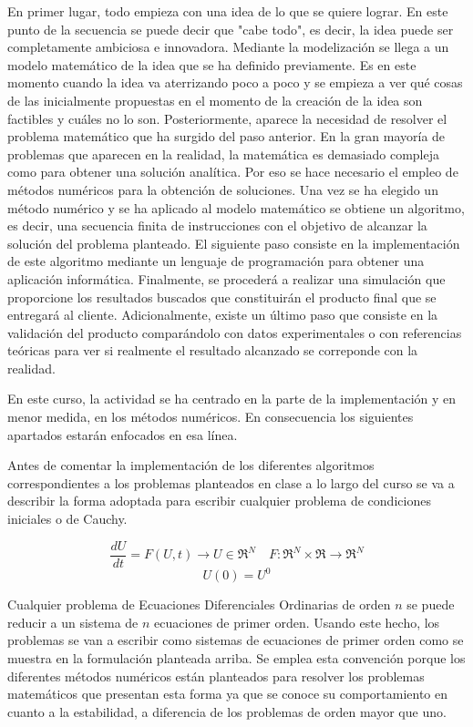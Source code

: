 \documentclass{article}
\begin{document}
	En primer lugar, todo empieza con una idea de lo que se quiere lograr. En este punto de la secuencia se puede decir que "cabe todo", es decir, la idea puede ser completamente ambiciosa e innovadora. Mediante la modelización se llega a un modelo matemático de la idea que se ha definido previamente. Es en este momento cuando la idea va aterrizando poco a poco y se empieza a ver qué cosas de las inicialmente propuestas en el momento de la creación de la idea son factibles y cuáles no lo son. Posteriormente, aparece la necesidad de resolver el problema matemático que ha surgido del paso anterior. En la gran mayoría de problemas que aparecen en la realidad, la matemática es demasiado compleja como para obtener una solución analítica. Por eso se hace necesario el empleo de métodos numéricos para la obtención de soluciones. Una vez se ha elegido un método numérico y se ha aplicado al modelo matemático se obtiene un algoritmo, es decir, una secuencia finita de instrucciones con el objetivo de alcanzar la solución del problema planteado. El siguiente paso consiste en la implementación de este algoritmo mediante un lenguaje de programación para obtener una aplicación informática. Finalmente, se procederá a realizar una simulación que proporcione los resultados buscados que constituirán el producto final que se entregará al cliente. Adicionalmente, existe un último paso que consiste en la validación del producto comparándolo con datos experimentales o con referencias teóricas para ver si realmente el resultado alcanzado se correponde con la realidad.
	
	En este curso, la actividad se ha centrado en la parte de la implementación y en menor medida, en los métodos numéricos. En consecuencia los siguientes apartados estarán enfocados en esa línea.
	
	\newpage
	
	Antes de comentar la implementación de los diferentes algoritmos correspondientes a los problemas planteados en clase a lo largo del curso se va a describir la forma adoptada para escribir cualquier problema de condiciones iniciales o de Cauchy.
	
	$$\frac{dU}{dt}=F(U,t)\rightarrow U\in \Re^N\quad F:\Re^N\times \Re\rightarrow \Re^N$$
	$$U(0)=U^0$$
	
	Cualquier problema de Ecuaciones Diferenciales Ordinarias de orden $n$ se puede reducir a un sistema de $n$ ecuaciones de primer orden. Usando este hecho, los problemas se van a escribir como sistemas de ecuaciones de primer orden como se muestra en la formulación planteada arriba. Se emplea esta convención porque los diferentes métodos numéricos están planteados para resolver los problemas matemáticos que presentan esta forma ya que se conoce su comportamiento en cuanto a la estabilidad, a diferencia de los problemas de orden mayor que uno.
	
\end{document}
